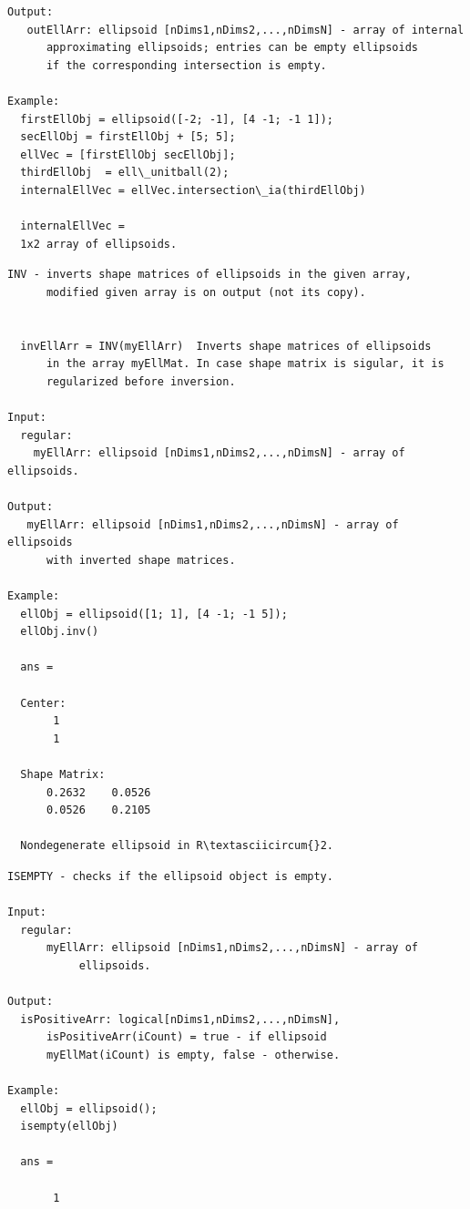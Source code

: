 \documentclass[letterpaper,10pt,english]{sphinxmanual}
\begin{document}
\begin{Verbatim}[commandchars=\\\{\}]
Output:
   outEllArr: ellipsoid [nDims1,nDims2,...,nDimsN] - array of internal
      approximating ellipsoids; entries can be empty ellipsoids
      if the corresponding intersection is empty.

Example:
  firstEllObj = ellipsoid([-2; -1], [4 -1; -1 1]);
  secEllObj = firstEllObj + [5; 5];
  ellVec = [firstEllObj secEllObj];
  thirdEllObj  = ell\_unitball(2);
  internalEllVec = ellVec.intersection\_ia(thirdEllObj)

  internalEllVec =
  1x2 array of ellipsoids.
\end{Verbatim}

\begin{Verbatim}[commandchars=\\\{\}]
INV - inverts shape matrices of ellipsoids in the given array,
      modified given array is on output (not its copy).


  invEllArr = INV(myEllArr)  Inverts shape matrices of ellipsoids
      in the array myEllMat. In case shape matrix is sigular, it is
      regularized before inversion.

Input:
  regular:
    myEllArr: ellipsoid [nDims1,nDims2,...,nDimsN] - array of ellipsoids.

Output:
   myEllArr: ellipsoid [nDims1,nDims2,...,nDimsN] - array of ellipsoids
      with inverted shape matrices.

Example:
  ellObj = ellipsoid([1; 1], [4 -1; -1 5]);
  ellObj.inv()

  ans =

  Center:
       1
       1

  Shape Matrix:
      0.2632    0.0526
      0.0526    0.2105

  Nondegenerate ellipsoid in R\textasciicircum{}2.
\end{Verbatim}

\begin{Verbatim}[commandchars=\\\{\}]
ISEMPTY - checks if the ellipsoid object is empty.

Input:
  regular:
      myEllArr: ellipsoid [nDims1,nDims2,...,nDimsN] - array of
           ellipsoids.

Output:
  isPositiveArr: logical[nDims1,nDims2,...,nDimsN],
      isPositiveArr(iCount) = true - if ellipsoid
      myEllMat(iCount) is empty, false - otherwise.

Example:
  ellObj = ellipsoid();
  isempty(ellObj)

  ans =

       1
\end{Verbatim}
\end{document}
